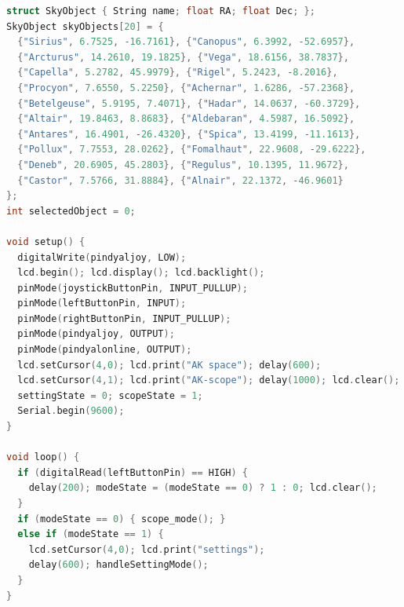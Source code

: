 \documentclass[12pt,a4paper]{report}
\begin{document}
\begin{enumerate}
\begin{enumerate}
\begin{lstlisting}[language=C++, caption={Firmware complet de l'Arduino n°1 (Télécommande, calculs et IHM).}, label={lst:arduino1}]
struct SkyObject { String name; float RA; float Dec; };
SkyObject skyObjects[20] = {
  {"Sirius", 6.7525, -16.7161}, {"Canopus", 6.3992, -52.6957},
  {"Arcturus", 14.2610, 19.1825}, {"Vega", 18.6156, 38.7837},
  {"Capella", 5.2782, 45.9979}, {"Rigel", 5.2423, -8.2016},
  {"Procyon", 7.6550, 5.2250}, {"Achernar", 1.6286, -57.2368},
  {"Betelgeuse", 5.9195, 7.4071}, {"Hadar", 14.0637, -60.3729},
  {"Altair", 19.8463, 8.8683}, {"Aldebaran", 4.5987, 16.5092},
  {"Antares", 16.4901, -26.4320}, {"Spica", 13.4199, -11.1613},
  {"Pollux", 7.7553, 28.0262}, {"Fomalhaut", 22.9608, -29.6222},
  {"Deneb", 20.6905, 45.2803}, {"Regulus", 10.1395, 11.9672},
  {"Castor", 7.5766, 31.8884}, {"Alnair", 22.1372, -46.9601}
};
int selectedObject = 0;

void setup() {
  digitalWrite(pindyaljoy, LOW);
  lcd.begin(); lcd.display(); lcd.backlight();
  pinMode(joystickButtonPin, INPUT_PULLUP);
  pinMode(leftButtonPin, INPUT);
  pinMode(rightButtonPin, INPUT_PULLUP);
  pinMode(pindyaljoy, OUTPUT);
  pinMode(pindyalonline, OUTPUT);
  lcd.setCursor(4,0); lcd.print("AK space"); delay(600);
  lcd.setCursor(4,1); lcd.print("AK-scope"); delay(1000); lcd.clear();
  settingState = 0; scopeState = 1;
  Serial.begin(9600);
}

void loop() {
  if (digitalRead(leftButtonPin) == HIGH) {
    delay(200); modeState = (modeState == 0) ? 1 : 0; lcd.clear();
  }
  if (modeState == 0) { scope_mode(); }
  else if (modeState == 1) {
    lcd.setCursor(4,0); lcd.print("settings");
    delay(600); handleSettingMode();
  }
}


\end{lstlisting}
\end{enumerate}
\end{enumerate}
\end{document}

